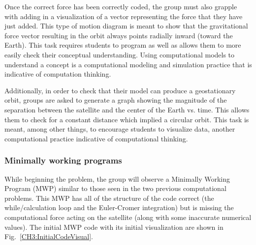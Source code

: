 \documentclass{msuphddissertation}
\begin{document}
\begin{doublespace}
Once the correct force has been correctly coded, the group must also grapple with adding in a visualization of a vector representing the force that they have just added.  This type of motion diagram is meant to show that the gravitational force vector resulting in the orbit always points radially inward (toward the Earth).  This task requires students to program as well as allows them to more easily check their conceptual understanding.  Using computational models to understand a concept is a computational modeling and simulation practice that is indicative of computation thinking.

Additionally, in order to check that their model can produce a geostationary orbit, groups are asked to generate a graph showing the magnitude of the separation between the satellite and the center of the Earth vs. time.  This allows them to check for a constant distance which implied a circular orbit.  This task is meant, among other things, to encourage students to visualize data, another computational practice indicative of computational thinking.

\subsubsection{Minimally working programs}

While beginning the problem, the group will observe a Minimally Working Program (MWP) similar to those seen in the two previous computational problems.  This MWP has all of the structure of the code correct (the while/calculation loop and the Euler-Cromer integration) but is missing the computational force acting on the satellite (along with some inaccurate numerical values).  The initial MWP code with its initial visualization are shown in Fig.~\ref{CH3:InitialCodeVisual}.


\end{doublespace}
\end{document}
